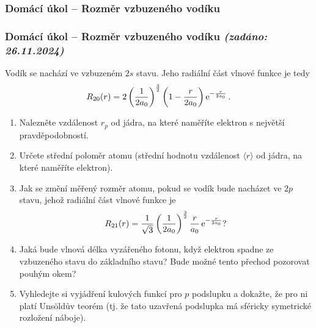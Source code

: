 \documentclass[a4paper,11pt,twoside]{article}
\newenvironment{homework}{}{}
\newcommand{\np}{\clearpage\newpage}
\newcommand{\exercise}[2][]{\ifthenelse{\isempty{#1}}
	{\np\thispagestyle{empty}\subsubsection*{Domácí úkol -- #2}}
	{\np\thispagestyle{empty}\np\subsubsection*{Domácí úkol -- #2 \small{\it{(zadáno: {#1})}}}}
}
\begin{document}
\begin{homework}
	\exercise[26.11.2024]{Rozměr vzbuzeného vodíku}
		Vodík se nachází ve vzbuzeném $2s$ stavu.
		Jeho radiální část vlnové funkce je tedy
		\begin{equation*}
			R_{20}(r)=2\left(\frac{1}{2a_{0}}\right)^{\frac{3}{2}}\left(1-\frac{r}{2a_{0}}\right)\operatorname{e}^{-\frac{r}{2a_0}}.
		\end{equation*}

		\begin{enumerate}
			\item
				Nalezněte vzdálenost $r_{p}$ od jádra, na které naměříte elektron s největší pravděpodobností.

			\item
				Určete střední poloměr atomu (střední hodnotu vzdálenost $\langle r\rangle$ od jádra, na které naměříte elektron).

			\item
				Jak se změní měřený rozměr atomu, pokud se vodík bude nacházet ve $2p$ stavu, jehož radiální část vlnové funkce je
				\begin{equation*}
					R_{21}(r)=\frac{1}{\sqrt{3}}\left(\frac{1}{2a_{0}}\right)^{\frac{3}{2}}\frac{r}{a_{0}}\operatorname{e}^{-\frac{r}{2a_{0}}}?
				\end{equation*}

			\item
				Jaká bude vlnová délka vyzářeného fotonu, když elektron spadne ze vzbuzeného stavu do základního stavu?
				Bude možné tento přechod pozorovat pouhým okem?

			\item
				Vyhledejte si vyjádření kulových funkcí pro $p$ podslupku a dokažte, že pro ni platí Unsöldův teorém (tj. že tato uzavřená podslupka má sféricky symetrické rozložení náboje).
		\end{enumerate}

		\newpage
\end{homework}
\end{document}
